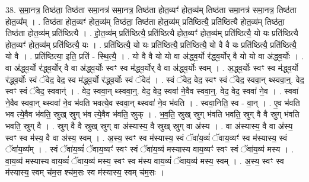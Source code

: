 \documentclass[17pt]{extarticle}
\begin{document}
38. स॒मा॒नत्र॒ तिष्ठ॑ता॒ तिष्ठ॑ता समा॒नत्र॑ समा॒नत्र॒ तिष्ठ॑ता होत॒व्यꣳ॑ होत॒व्य॑म् तिष्ठ॑ता समा॒नत्र॑ समा॒नत्र॒ तिष्ठ॑ता होत॒व्य᳚म् । . तिष्ठ॑ता होत॒व्यꣳ॑ होत॒व्य॑म् तिष्ठ॑ता॒ तिष्ठ॑ता होत॒व्य॑म् प्रति॑ष्ठित्यै॒ प्रति॑ष्ठित्यै होत॒व्य॑म् तिष्ठ॑ता॒ तिष्ठ॑ता होत॒व्य॑म् प्रति॑ष्ठित्यै । . हो॒त॒व्य॑म् प्रति॑ष्ठित्यै॒ प्रति॑ष्ठित्यै होत॒व्यꣳ॑ होत॒व्य॑म् प्रति॑ष्ठित्यै॒ यो यः प्रति॑ष्ठित्यै होत॒व्यꣳ॑ होत॒व्य॑म् प्रति॑ष्ठित्यै॒ यः । . प्रति॑ष्ठित्यै॒ यो यः प्रति॑ष्ठित्यै॒ प्रति॑ष्ठित्यै॒ यो वै वै यः प्रति॑ष्ठित्यै॒ प्रति॑ष्ठित्यै॒ यो वै । . प्रति॑ष्ठित्या॒ इति॒ प्रति॑ - स्थि॒त्यै॒ । . यो वै वै यो यो वा अ॑द्ध्व॒र्यो र॑द्ध्व॒र्योर् वै यो यो वा अ॑द्ध्व॒र्योः । . वा अ॑द्ध्व॒र्यो र॑द्ध्व॒र्योर् वै वा अ॑द्ध्व॒र्योः स्वꣳ स्व म॑द्ध्व॒र्योर् वै वा अ॑द्ध्व॒र्योः स्वम् । . अ॒द्ध्व॒र्योः स्वꣳ स्व म॑द्ध्व॒र्यो र॑द्ध्व॒र्योः स्वं ॅवेद॒ वेद॒ स्व म॑द्ध्व॒र्यो र॑द्ध्व॒र्योः स्वं ॅवेद॑ । . स्वं ॅवेद॒ वेद॒ स्वꣳ स्वं ॅवेद॒ स्ववा॒न् थ्स्ववा॒न्॒. वेद॒ स्वꣳ स्वं ॅवेद॒ स्ववान्॑ । . वेद॒ स्ववा॒न् थ्स्ववा॒न्॒. वेद॒ वेद॒ स्ववा॑ ने॒वैव स्ववा॒न्॒. वेद॒ वेद॒ स्ववा॑ ने॒व । . स्ववा॑ ने॒वैव स्ववा॒न् थ्स्ववा॑ ने॒व भ॑वति भवत्ये॒व स्ववा॒न् थ्स्ववा॑ ने॒व भ॑वति । . स्ववा॒निति॒ स्व - वा॒न् । . ए॒व भ॑वति भव त्ये॒वैव भ॑वति॒ स्रुख् स्रुग् भ॑व त्ये॒वैव भ॑वति॒ स्रुक् । . भ॒व॒ति॒ स्रुख् स्रुग् भ॑वति भवति॒ स्रुग् वै वै स्रुग् भ॑वति भवति॒ स्रुग् वै । . स्रुग् वै वै स्रुख् स्रुग् वा अ॑स्यास्य॒ वै स्रुख् स्रुग् वा अ॑स्य । . वा अ॑स्यास्य॒ वै वा अ॑स्य॒ स्वꣳ स्व म॑स्य॒ वै वा अ॑स्य॒ स्वम् । . अ॒स्य॒ स्वꣳ स्व म॑स्यास्य॒ स्वं ॅवा॑य॒व्यं॑ ॅवाय॒व्यꣳ॑ स्व म॑स्यास्य॒ स्वं ॅवा॑य॒व्य᳚म् । . स्वं ॅवा॑य॒व्यं॑ ॅवाय॒व्यꣳ॑ स्वꣳ स्वं ॅवा॑य॒व्य॑ मस्यास्य वाय॒व्यꣳ॑ स्वꣳ स्वं ॅवा॑य॒व्य॑ मस्य । . वा॒य॒व्य॑ मस्यास्य वाय॒व्यं॑ ॅवाय॒व्य॑ मस्य॒ स्वꣳ स्व म॑स्य वाय॒व्यं॑ ॅवाय॒व्य॑ मस्य॒ स्वम् । . अ॒स्य॒ स्वꣳ स्व म॑स्यास्य॒ स्वम् च॑म॒स श्च॑म॒सः स्व म॑स्यास्य॒ स्वम् च॑म॒सः । \newline
\pagebreak
{}
\end{document}
